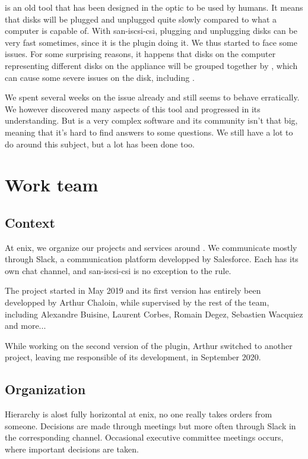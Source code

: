  is an old tool that has been designed in the optic to be used by humans. It means that disks will be plugged and unplugged quite slowly compared to what a computer is capable of. With \gls{san-iscsi-csi}, plugging and unplugging disks can be very fast sometimes, since it is the plugin doing it. We thus started to face some  issues. For some surprising reasons, it happens that disks on the computer representing different disks on the appliance will be grouped together by , which can cause some severe issues on the disk, including .

We spent several weeks on the issue already and  still seems to behave erratically. We however discovered many aspects of this tool and progressed in its understanding. But  is a very complex software and its community isn't that big, meaning that it's hard to find answers to some questions. We still have a lot to do around this subject, but a lot has been done too.

\section{Work team}

\subsection{Context}

At \gls{enix}, we organize our projects and services around . We communicate mostly through Slack, a communication platform developped by Salesforce. Each  has its own chat channel, and \gls{san-iscsi-csi} is no exception to the rule.

The project started in May 2019 and its first version has entirely been developped by Arthur Chaloin, while supervised by the rest of the team, including Alexandre Buisine, Laurent Corbes, Romain Degez, Sebastien Wacquiez and more...

While working on the second version of the plugin, Arthur switched to another project, leaving me responsible of its development, in September 2020.

\subsection{Organization}

Hierarchy is alost fully horizontal at \gls{enix}, no one really takes orders from someone. Decisions are made through meetings but more often through Slack in the corresponding  channel. Occasional executive committee meetings occurs, where important decisions are taken.

